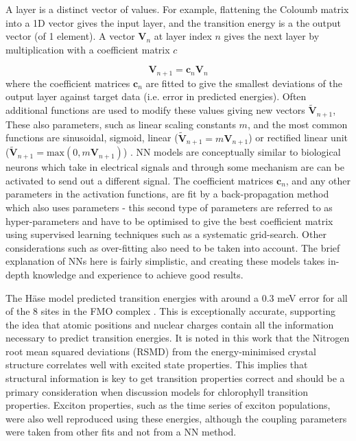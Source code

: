 A layer is a distinct vector of values. For example, flattening the Coloumb matrix
into a 1D vector gives the input layer, and the \Qy transition energy is a the output 
vector (of 1 element). A vector $\mathbf{V}_n$ at layer index $n$ gives the next layer
by multiplication with a coefficient matrix $c$

\begin{equation}
	\mathbf{V}_{n+1} = \mathbf{c}_n \mathbf{V}_n	
\end{equation}
%
where the coefficient matrices $\mathbf{c}_n$ are fitted to give the smallest deviations
of the output layer against target data (i.e. error in predicted \Qy energies).
Often additional functions are used to modify these values giving new vectors $\tilde{\mathbf{V}}_{n+1}$,
These also parameters, such as linear scaling constants $m$, and the most common 
functions are sinusoidal, sigmoid, linear ($\tilde{\mathbf{V}}_{n+1}=m \mathbf{V}_{n+1}$) 
or rectified linear unit ($\tilde{\mathbf{V}}_{n+1}=\text{max}\left(0, m \mathbf{V}_{n+1} \right)$)
. NN models are conceptually similar to biological neurons which take in electrical
signals and through some mechanism are can be activated to send out a different signal.
The coefficient matrices $\mathbf{c}_n$, and any other parameters in the activation
functions, are fit by a back-propagation method which also uses parameters - this
second type of parameters are referred to as hyper-parameters and have to be optimised 
to give the best coefficient matrix using supervised learning techniques such as
a systematic grid-search. Other considerations such as over-fitting also need to 
be taken into account. The brief explanation of NNs here is fairly simplistic, and
creating these models takes in-depth knowledge and experience to achieve good results.

The H\"{a}se model predicted \Qy transition energies with around a 0.3 meV error
for all of the 8 sites in the FMO complex \cite{AspuruGuzik2016}. This is exceptionally
accurate, supporting the idea that atomic positions and nuclear charges contain 
all the information necessary to predict transition energies. It is noted in this
work that the Nitrogen root mean squared deviations (RSMD) from the energy-minimised
crystal structure correlates well with excited state properties. This implies that
structural information is key to get transition properties correct and should be
a primary consideration when discussion models for chlorophyll transition properties.
Exciton properties, such as the time series of exciton populations, were also well 
reproduced using these \Qy energies, although the coupling parameters were taken 
from other fits and not from a NN method.

